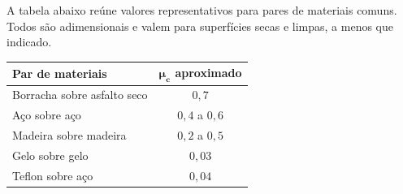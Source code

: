 A tabela abaixo reúne valores representativos para pares de materiais
comuns.
Todos são adimensionais e valem para superfícies secas e limpas,
a menos que indicado.

\begin{center}
\begin{tabular}{lc}
\hline
\textbf{Par de materiais} & $\boldsymbol{\mu_c}$ \textbf{aproximado} \\
\hline
Borracha sobre asfalto seco & $0{,}7$ \\
Aço sobre aço               & $0{,}4$ a $0{,}6$ \\
Madeira sobre madeira       & $0{,}2$ a $0{,}5$ \\
Gelo sobre gelo             & $0{,}03$ \\
Teflon sobre aço            & $0{,}04$ \\
\hline
\end{tabular}
\end{center}


\vspace{0.3cm}

